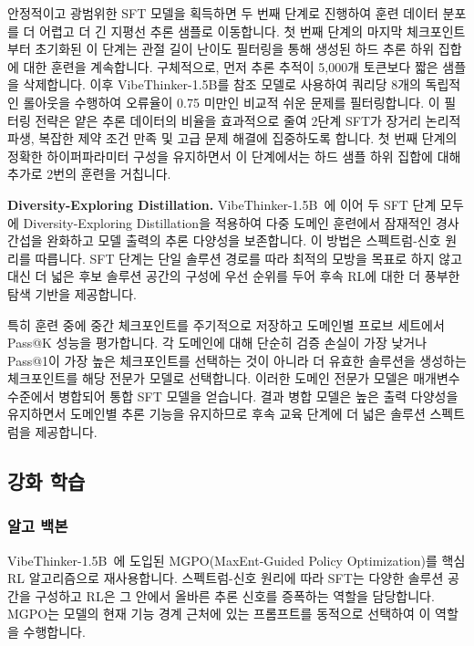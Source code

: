 \documentclass{article}
\begin{document}
안정적이고 광범위한 SFT 모델을 획득하면 두 번째 단계로 진행하여 훈련 데이터 분포를 더 어렵고 더 긴 지평선 추론 샘플로 이동합니다. 첫 번째 단계의 마지막 체크포인트부터 초기화된 이 단계는 관절 길이 난이도 필터링을 통해 생성된 하드 추론 하위 집합에 대한 훈련을 계속합니다. 구체적으로, 먼저 추론 추적이 5,000개 토큰보다 짧은 샘플을 삭제합니다. 이후 VibeThinker-1.5B를 참조 모델로 사용하여 쿼리당 8개의 독립적인 롤아웃을 수행하여 오류율이 0.75 미만인 비교적 쉬운 문제를 필터링합니다. 이 필터링 전략은 얕은 추론 데이터의 비율을 효과적으로 줄여 2단계 SFT가 장거리 논리적 파생, 복잡한 제약 조건 만족 및 고급 문제 해결에 집중하도록 합니다. 첫 번째 단계의 정확한 하이퍼파라미터 구성을 유지하면서 이 단계에서는 하드 샘플 하위 집합에 대해 추가로 2번의 훈련을 거칩니다.

\textbf{Diversity-Exploring Distillation.} VibeThinker-1.5B~\cite{xu2025vibethinker}에 이어 두 SFT 단계 모두에 Diversity-Exploring Distillation을 적용하여 다중 도메인 훈련에서 잠재적인 경사 간섭을 완화하고 모델 출력의 추론 다양성을 보존합니다. 이 방법은 스펙트럼-신호 원리를 따릅니다. SFT 단계는 단일 솔루션 경로를 따라 최적의 모방을 목표로 하지 않고 대신 더 넓은 후보 솔루션 공간의 구성에 우선 순위를 두어 후속 RL에 대한 더 풍부한 탐색 기반을 제공합니다.

특히 훈련 중에 중간 체크포인트를 주기적으로 저장하고 도메인별 프로브 세트에서 Pass@K 성능을 평가합니다. 각 도메인에 대해 단순히 검증 손실이 가장 낮거나 Pass@1이 가장 높은 체크포인트를 선택하는 것이 아니라 더 유효한 솔루션을 생성하는 체크포인트를 해당 전문가 모델로 선택합니다. 이러한 도메인 전문가 모델은 매개변수 수준에서 병합되어 통합 SFT 모델을 얻습니다. 결과 병합 모델은 높은 출력 다양성을 유지하면서 도메인별 추론 기능을 유지하므로 후속 교육 단계에 더 넓은 솔루션 스펙트럼을 제공합니다.

\subsection{강화 학습}
\subsubsection{알고 백본}

VibeThinker-1.5B~\cite{xu2025vibethinker}에 도입된 MGPO(MaxEnt-Guided Policy Optimization)를 핵심 RL 알고리즘으로 재사용합니다. 스펙트럼-신호 원리에 따라 SFT는 다양한 솔루션 공간을 구성하고 RL은 그 안에서 올바른 추론 신호를 증폭하는 역할을 담당합니다. MGPO는 모델의 현재 기능 경계 근처에 있는 프롬프트를 동적으로 선택하여 이 역할을 수행합니다.
\end{document}
